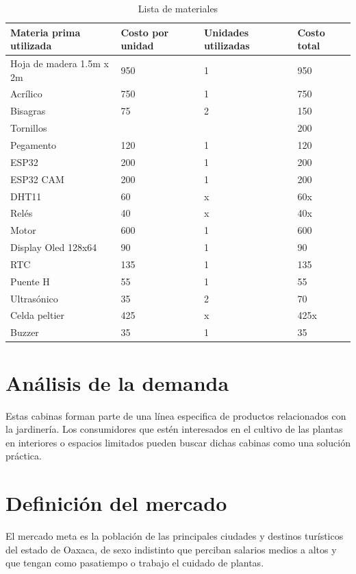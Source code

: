 \begin{table}[H]
\centering
\caption{Lista de materiales}
\begin{tabular}{|p{4cm}|p{3cm}|p{3cm}|p{3cm}|}
\hline
\textbf{Materia prima utilizada}
&\textbf{Costo por unidad} &\textbf{Unidades utilizadas} &\textbf{Costo total}\\
\hline
Hoja de madera 1.5m x 2m & 950 & 1 &950\\
\hline
Acrílico & 750 & 1 & 750\\
\hline
Bisagras & 75 & 2 & 150\\
\hline
Tornillos & & & 200\\
\hline
Pegamento & 120 & 1 &120\\
\hline
ESP32 & 200 &1 &200\\
\hline
ESP32 CAM &200&1 &200\\
\hline
DHT11&60 &x &60x\\
\hline
Relés & 40 & x & 40x \\
\hline
Motor & 600 & 1 &600\\
\hline
Display Oled 128x64 & 90&1&90\\
\hline
RTC&135&1&135\\
\hline
Puente H&55&1&55\\
\hline
Ultrasónico&35&2&70\\
\hline
Celda peltier&425&x&425x\\
\hline
Buzzer&35&1&35\\
\hline
\end{tabular}
\label{tabla:piezasSoporteEstabilizador}
\end{table}

\section{Análisis de la demanda}
Estas cabinas forman parte de una línea especifica de productos relacionados con la jardinería. Los consumidores que estén interesados en el cultivo de las plantas en interiores o espacios limitados pueden buscar dichas cabinas como una solución práctica.

\section{Definición del mercado}

El mercado meta es la población de las principales ciudades y destinos turísticos del estado de Oaxaca, de sexo indistinto que perciban salarios medios a altos y que tengan como pasatiempo o trabajo el cuidado de plantas.


